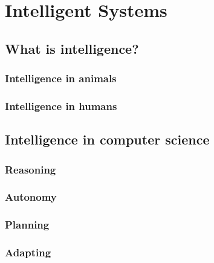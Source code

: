 
\chapter{Intelligent Systems}
\label{ch:intelligent-systems}

\section{What is intelligence?}\label{sec:what-is-intelligence}

\subsection{Intelligence in animals}\label{subsec:intelligence-in-animals}

\subsection{Intelligence in humans}\label{subsec:intelligence-in-humans}

\section{Intelligence in computer science}\label{sec:intelligence-in-computer-science}

\subsection{Reasoning}\label{subsec:reasoning}

\subsection{Autonomy}\label{subsec:autonomy}

\subsection{Planning}\label{subsec:planning}

\subsection{Adapting}\label{subsec:adapting}

